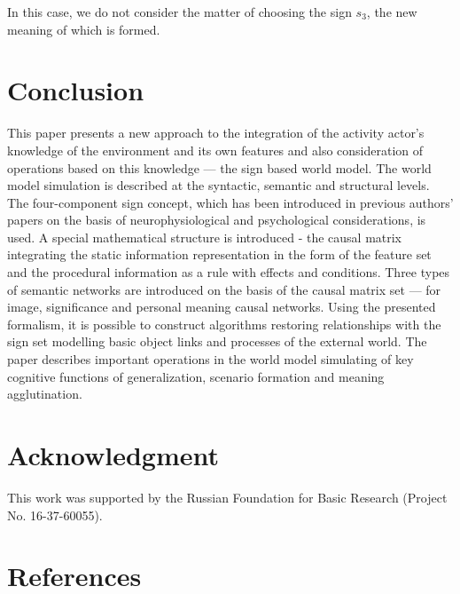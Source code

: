 \documentclass[review]{elsarticle}
\begin{document}
In this case, we do not consider the matter of choosing the sign $s_3$, the new meaning of which is formed.

\section*{Conclusion}
This paper presents a new approach to the integration of the activity actor’s knowledge of the environment and its own features and also consideration of operations based on this knowledge --- the sign based world model. The world model simulation is described at the syntactic, semantic and structural levels. The four-component sign concept, which has been introduced in previous authors’ papers on the basis of neurophysiological and psychological considerations, is used. A special mathematical structure is introduced - the causal matrix integrating the static information representation in the form of the feature set and the procedural information as a rule with effects and conditions. Three types of semantic networks are introduced on the basis of the causal matrix set --- for image, significance and personal meaning causal networks. Using the presented formalism, it is possible to construct algorithms restoring relationships with the sign set modelling basic object links and processes of the external world. The paper describes important operations in the world model simulating of key cognitive functions of generalization, scenario formation and meaning agglutination.

\section*{Acknowledgment}
This work was supported by the Russian Foundation for Basic Research (Project No. 16-37-60055).

\section*{References}


\end{document}
